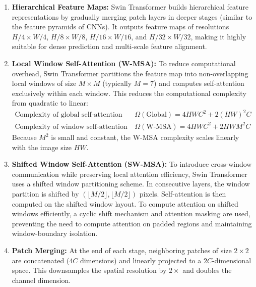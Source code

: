 \documentclass[11pt, a4paper]{article}
\begin{document}
\begin{enumerate}
    \item \textbf{Hierarchical Feature Maps:} Swin Transformer builds hierarchical feature representations by gradually merging patch layers in deeper stages (similar to the feature pyramids of CNNs). It outputs feature maps of resolutions $H/4 \times W/4$, $H/8 \times W/8$, $H/16 \times W/16$, and $H/32 \times W/32$, making it highly suitable for dense prediction and multi-scale feature alignment.
    
    \item \textbf{Local Window Self-Attention (W-MSA):} To reduce computational overhead, Swin Transformer partitions the feature map into non-overlapping local windows of size $M \times M$ (typically $M=7$) and computes self-attention exclusively within each window. This reduces the computational complexity from quadratic to linear:
    \begin{align}
        \text{Complexity of global self-attention (ViT):} \quad &\Omega(\text{Global}) = 4HWC^2 + 2(HW)^2 C \\
        \text{Complexity of window self-attention (W-MSA):} \quad &\Omega(\text{W-MSA}) = 4HWC^2 + 2HWM^2 C
    \end{align}
    Because $M^2$ is small and constant, the W-MSA complexity scales linearly with the image size $HW$.
    
    \item \textbf{Shifted Window Self-Attention (SW-MSA):} To introduce cross-window communication while preserving local attention efficiency, Swin Transformer uses a shifted window partitioning scheme. In consecutive layers, the window partition is shifted by $(\lfloor M/2 \rfloor, \lfloor M/2 \rfloor)$ pixels. Self-attention is then computed on the shifted window layout. To compute attention on shifted windows efficiently, a cyclic shift mechanism and attention masking are used, preventing the need to compute attention on padded regions and maintaining window-boundary isolation.
    
    \item \textbf{Patch Merging:} At the end of each stage, neighboring patches of size $2 \times 2$ are concatenated ($4C$ dimensions) and linearly projected to a $2C$-dimensional space. This downsamples the spatial resolution by $2\times$ and doubles the channel dimension.
\end{enumerate}

\end{document}
